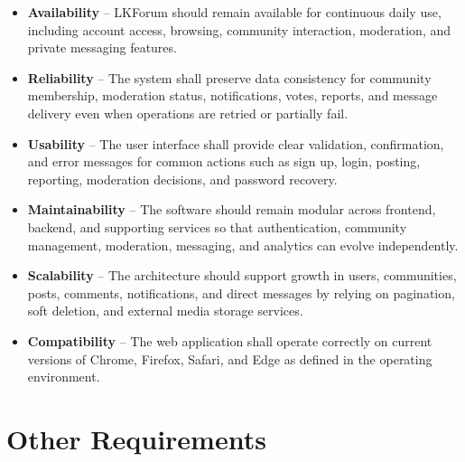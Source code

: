 \documentclass{scrreprt}
\begin{document}
\begin{itemize}[leftmargin=2cm]
    \item[\textbf{QA-1:}] \textbf{Availability} -- LKForum should remain available for continuous daily use, including account access, browsing, community interaction, moderation, and private messaging features.
    \item[\textbf{QA-2:}] \textbf{Reliability} -- The system shall preserve data consistency for community membership, moderation status, notifications, votes, reports, and message delivery even when operations are retried or partially fail.
    \item[\textbf{QA-3:}] \textbf{Usability} -- The user interface shall provide clear validation, confirmation, and error messages for common actions such as sign up, login, posting, reporting, moderation decisions, and password recovery.
    \item[\textbf{QA-4:}] \textbf{Maintainability} -- The software should remain modular across frontend, backend, and supporting services so that authentication, community management, moderation, messaging, and analytics can evolve independently.
    \item[\textbf{QA-5:}] \textbf{Scalability} -- The architecture should support growth in users, communities, posts, comments, notifications, and direct messages by relying on pagination, soft deletion, and external media storage services.
    \item[\textbf{QA-6:}] \textbf{Compatibility} -- The web application shall operate correctly on current versions of Chrome, Firefox, Safari, and Edge as defined in the operating environment.
\end{itemize}

\chapter{Other Requirements}
\end{document}
